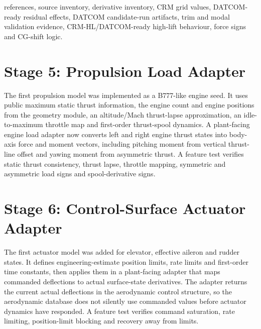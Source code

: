 references, source inventory, derivative inventory, CRM grid values, DATCOM-ready residual effects, DATCOM candidate-run artifacts, trim and modal validation evidence, CRM-HL/DATCOM-ready high-lift behaviour, force signs and CG-shift logic.

\section*{Stage 5: Propulsion Load Adapter}

The first propulsion model was implemented as a B777-like engine seed. It uses
public maximum static thrust information, the engine count and engine positions
from the geometry module, an altitude/Mach thrust-lapse approximation, an
idle-to-maximum throttle map and first-order thrust-spool dynamics. A
plant-facing engine load adapter now converts left and right engine thrust
states into body-axis force and moment vectors, including pitching moment from
vertical thrust-line offset and yawing moment from asymmetric thrust. A feature
test verifies static thrust consistency, thrust lapse, throttle mapping,
symmetric and asymmetric load signs and spool-derivative signs.

\section*{Stage 6: Control-Surface Actuator Adapter}

The first actuator model was added for elevator, effective aileron and rudder
states. It defines engineering-estimate position limits, rate limits and
first-order time constants, then applies them in a plant-facing adapter that
maps commanded deflections to actual surface-state derivatives. The adapter
returns the current actual deflections in the aerodynamic control structure, so
the aerodynamic database does not silently use commanded values before actuator
dynamics have responded. A feature test verifies command saturation, rate
limiting, position-limit blocking and recovery away from limits.
